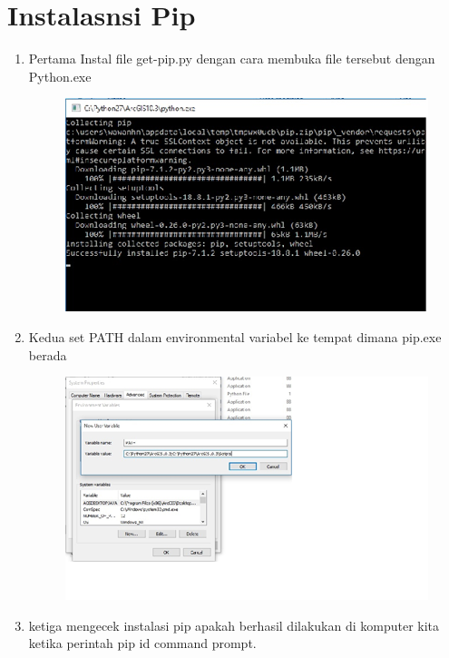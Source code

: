 





\section{Instalasnsi Pip}
\begin{enumerate}
    \item Pertama Instal file get-pip.py dengan cara membuka file tersebut dengan Python.exe 
    
\begin{figure}[!htbp]
    \centering
    \includegraphics[scale=0.5]{figures/4.png}
    \label{visimisi}
\end{figure}

    \item Kedua set PATH dalam environmental variabel ke tempat dimana pip.exe berada

\begin{figure}[!htbp]
    \centering
    \includegraphics[scale=0.5]{figures/5.png}
    \label{visimisi}
\end{figure}

    \item ketiga  mengecek instalasi pip apakah berhasil dilakukan di komputer kita ketika perintah pip id command prompt.


\end{enumerate}
